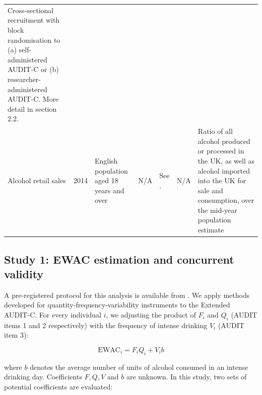 \documentclass[]{article}
\begin{document}
\begin{longtable}[]{@{}lllllrl@{}}
\begin{minipage}[t]{0.12\columnwidth}
Cross-sectional recruitment with block randomisation to (a)
self-administered AUDIT-C or (b) researcher-administered AUDIT-C. More
detail in section 2.2.\strut
\end{minipage}\tabularnewline
\begin{minipage}[t]{0.12\columnwidth}\raggedright
Alcohol retail sales \citep{PHE2017}\strut
\end{minipage} & \begin{minipage}[t]{0.12\columnwidth}\raggedright
2014\strut
\end{minipage} & \begin{minipage}[t]{0.12\columnwidth}\raggedright
English population aged 18 years and over\strut
\end{minipage} & \begin{minipage}[t]{0.12\columnwidth}\raggedright
N/A\strut
\end{minipage} & \begin{minipage}[t]{0.12\columnwidth}\raggedright
See \citep{PHE2017}.\strut
\end{minipage} & \begin{minipage}[t]{0.07\columnwidth}\raggedleft
N/A\strut
\end{minipage} & \begin{minipage}[t]{0.12\columnwidth}\raggedright
Ratio of all alcohol produced or processed in the UK, as well as alcohol
imported into the UK for sale and consumption, over the mid-year
population estimate\strut
\end{minipage}\tabularnewline
\bottomrule
\end{longtable}

\hypertarget{study-1-ewac-estimation-and-concurrent-validity}{%
\subsection{Study 1: EWAC estimation and concurrent
validity}\label{study-1-ewac-estimation-and-concurrent-validity}}

A pre-registered protocol for this analysis is available from
\cite{Dutey2018}. We apply methods developed for
quantity-frequency-variability instruments \citep{Lemmens1992} to the
Extended AUDIT-C. For every individual \(i\), we adjusting the product
of \(F_i\) and \(Q_i\) (AUDIT items 1 and 2 respectively) with the
frequency of intense drinking \(V_i\) (AUDIT item 3):

\[\text{EWAC}_i = F_i Q_i + V_ib\]

where \(b\) denotes the average number of units of alcohol consumed in
an intense drinking day. Coefficients \(F, Q, V\) and \(b\) are unknown.
In this study, two sets of potential coefficients are evaluated:
\end{document}
